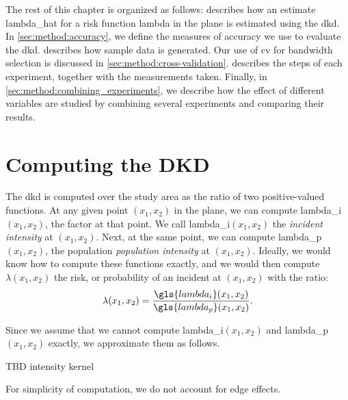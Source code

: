 The rest of this chapter is organized as follows:
 describes how an estimate \gls{lambda_hat} for a risk function \gls{lambda} in the plane is estimated using the \gls{dkd}.
In \cref{sec:method:accuracy}, we define the measures of accuracy we use to evaluate the \gls{dkd}.
 describes how sample data is generated.
Our use of \gls{cv} for bandwidth selection is discussed in  \cref{sec:method:cross-validation}.
 describes the steps of each experiment, together with the measurements taken.
Finally, in \cref{sec:method:combining_experiments}, we describe how the effect of different variables are studied by combining several experiments and comparing their results.

\section{Computing the DKD}
\label{sec:method:computing}

The \gls{dkd} is computed over the study area as the ratio of two positive-valued functions.
At any given point \((x_1, x_2)\) in the plane, we can compute \gls{lambda_i}\((x_1, x_2)\), the \gls{factor} at that point.
We call \gls{lambda_i}\((x_1, x_2)\) the \textit{incident intensity} at \((x_1, x_2)\).
Next, at the same point, we can compute \gls{lambda_p}\((x_1, x_2)\), the population \textit{population intensity} at \((x_1, x_2)\).
Ideally, we would know how to compute these functions exactly, and we would then compute \(\lambda(x_1, x_2)\) the risk,
or probability of an incident at \((x_1, x_2)\) with the ratio:
\begin{equation}
    \lambda(x_1, x_2) = \frac{\gls{lambda_i}(x_1, x_2)}{\gls{lambda_p}(x_1, x_2)}.
\end{equation}

Since we assume that we cannot compute \gls{lambda_i}\((x_1, x_2)\) and \gls{lambda_p}\((x_1, x_2)\) exactly,
we approximate them as follows.

TBD intensity kernel

For simplicity of computation, we do not account for edge effects.


